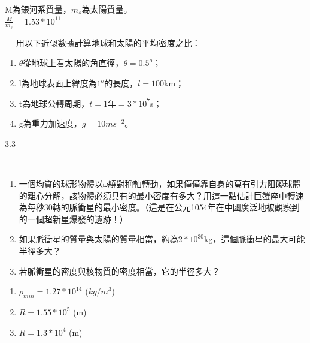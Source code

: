 \documentclass[cn,10pt,math=newtx,chinesefont=founder]{../elegantbook}
\begin{document}
\begin{solution}
M為銀河系質量，$m_s$為太陽質量。\\
$\frac{M}{m_s} = 1.53*10^{11}$
\end{solution}

\newpage


\begin{example}　
    用以下近似數據計算地球和太陽的平均密度之比：
    \begin{enumerate}[label=(\arabic*)]
    \item $\theta$從地球上看太陽的角直徑，$\theta = 0.5^o$；
    \item l為地球表面上緯度為$1^o$的長度，$l = 100$km；
    \item t為地球公轉周期，$t = 1$年$ = 3*10^7$s；
    \item g為重力加速度，$g = 10ms^{-2}$。
    \end{enumerate}
    
    \rightline{[2.1.19]}
\end{example}

\begin{solution}
3.3
\end{solution}

\newpage


\begin{example}　
    \begin{enumerate}[label=(\arabic*)]
    \item 一個均質的球形物體以$\omega$繞對稱軸轉動，如果僅僅靠自身的萬有引力阻礙球體的離心分解，該物體必須具有的最小密度有多大？用這一點估計巨蟹座中轉速為每秒30轉的脈衝星的最小密度。（這是在公元1054年在中國廣泛地被觀察到的一個超新星爆發的遺跡！）
    \item 如果脈衝星的質量與太陽的質量相當，約為$2*10^{30}$kg，這個脈衝星的最大可能半徑多大？
    \item 若脈衝星的密度與核物質的密度相當，它的半徑多大？
    \end{enumerate}
    
    \rightline{[2.1.20]}
\end{example}

\begin{solution}
 \begin{enumerate}[label=(\arabic*)]
\item $\rho_{min} = 1.27*10^{14}$ ($kg/m^3$)
\item $R = 1.55*10^5$ (m)
\item $R = 1.3*10^4$ (m)
\end{enumerate}
\end{solution}
\end{document}
